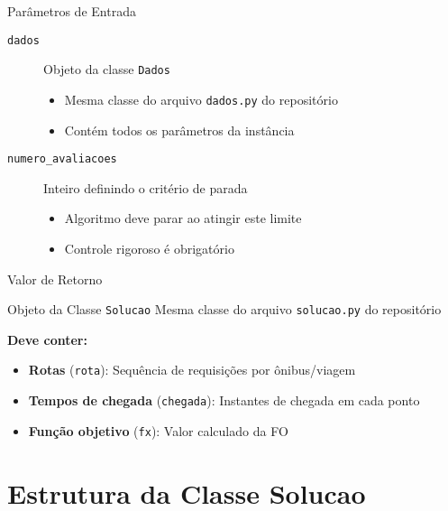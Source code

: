 \documentclass[10pt]{beamer}
\begin{document}
\begin{frame}{Parâmetros de Entrada}
    \begin{description}
        \item[\texttt{dados}] Objeto da classe \texttt{Dados}
        \begin{itemize}
            \item Mesma classe do arquivo \texttt{dados.py} do repositório
            \item Contém todos os parâmetros da instância
        \end{itemize}
        
        \vspace{0.5cm}
        
        \item[\texttt{numero\_avaliacoes}] Inteiro definindo o critério de parada
        \begin{itemize}
            \item Algoritmo deve parar ao atingir este limite
            \item Controle rigoroso é obrigatório
        \end{itemize}
    \end{description}
\end{frame}

\begin{frame}{Valor de Retorno}
    \begin{block}{Objeto da Classe \texttt{Solucao}}
        Mesma classe do arquivo \texttt{solucao.py} do repositório
    \end{block}
    
    \vspace{0.5cm}
    
    \textbf{Deve conter:}
    \begin{itemize}
        \item \textbf{Rotas} (\texttt{rota}): Sequência de requisições por ônibus/viagem
        \item \textbf{Tempos de chegada} (\texttt{chegada}): Instantes de chegada em cada ponto
        \item \textbf{Função objetivo} (\texttt{fx}): Valor calculado da FO
    \end{itemize}
\end{frame}

\section{Estrutura da Classe Solucao}
\end{document}
